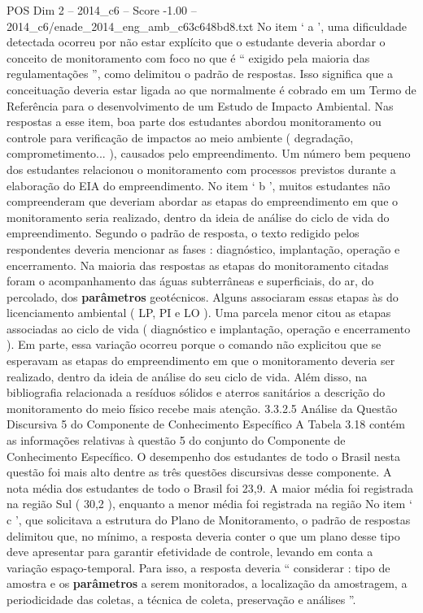 \begin{textsample}{POS Dim 2 – 2014\_c6 – Score -1.00 – 2014\_c6/enade\_2014\_eng\_amb\_c63c648bd8.txt}
No item ‘ a ’, uma dificuldade detectada ocorreu por não estar explícito que o estudante deveria abordar o conceito de monitoramento com foco no que é “ exigido pela maioria das regulamentações ”, como delimitou o padrão de respostas.
Isso significa que a conceituação deveria estar ligada ao que normalmente é cobrado em um Termo de Referência para o desenvolvimento de um Estudo de Impacto Ambiental.
Nas respostas a esse item, boa parte dos estudantes abordou monitoramento ou controle para verificação de impactos ao meio ambiente ( degradação, comprometimento... ), causados pelo empreendimento.
Um número bem pequeno dos estudantes relacionou o monitoramento com processos previstos durante a elaboração do EIA do empreendimento.
No item ‘ b ’, muitos estudantes não compreenderam que deveriam abordar as etapas do empreendimento em que o monitoramento seria realizado, dentro da ideia de análise do ciclo de vida do empreendimento.
Segundo o padrão de resposta, o texto redigido pelos respondentes deveria mencionar as fases : diagnóstico, implantação, operação e encerramento.
Na maioria das respostas as etapas do monitoramento citadas foram o acompanhamento das águas subterrâneas e superficiais, do ar, do percolado, dos \textbf{parâmetros} geotécnicos.
Alguns associaram essas etapas às do licenciamento ambiental ( LP, PI e LO ).
Uma parcela menor citou as etapas associadas ao ciclo de vida ( diagnóstico e implantação, operação e encerramento ).
Em parte, essa variação ocorreu porque o comando não explicitou que se esperavam as etapas do empreendimento em que o monitoramento deveria ser realizado, dentro da ideia de análise do seu ciclo de vida.
Além disso, na bibliografia relacionada a resíduos sólidos e aterros sanitários a descrição do monitoramento do meio físico recebe mais atenção. 3.3.2.5 Análise da Questão Discursiva 5 do Componente de Conhecimento Específico A Tabela 3.18 contém as informações relativas à questão 5 do conjunto do Componente de Conhecimento Específico.
O desempenho dos estudantes de todo o Brasil nesta questão foi mais alto dentre as três questões discursivas desse componente.
A nota média dos estudantes de todo o Brasil foi 23,9.
A maior média foi registrada na região Sul ( 30,2 ), enquanto a menor média foi registrada na região No item ‘ c ’, que solicitava a estrutura do Plano de Monitoramento, o padrão de respostas delimitou que, no mínimo, a resposta deveria conter o que um plano desse tipo deve apresentar para garantir efetividade de controle, levando em conta a variação espaço-temporal.
Para isso, a resposta deveria “ considerar : tipo de amostra e os \textbf{parâmetros} a serem monitorados, a localização da amostragem, a periodicidade das coletas, a técnica de coleta, preservação e análises ”.

\end{textsample}
